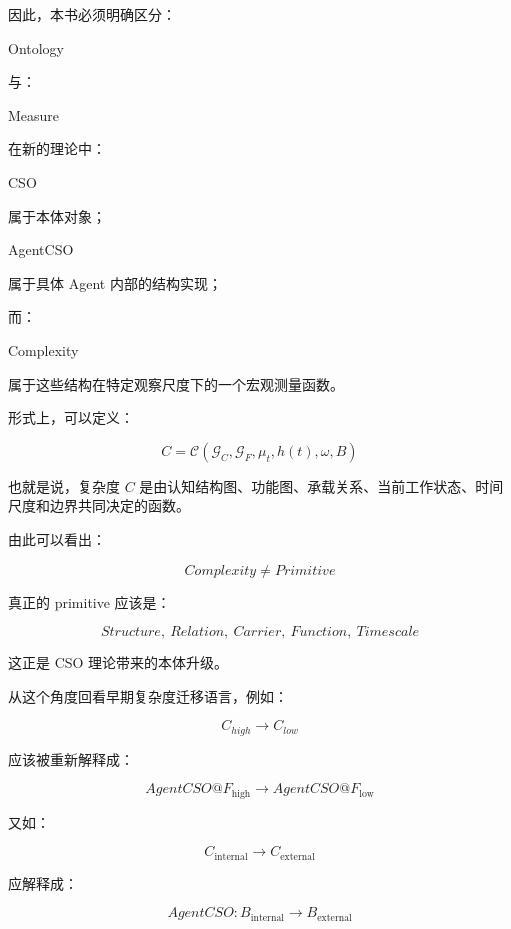 因此，本书必须明确区分：

\begin{statementbox}
Ontology
\end{statementbox}

与：

\begin{statementbox}
Measure
\end{statementbox}

在新的理论中：

\begin{statementbox}
CSO
\end{statementbox}

属于本体对象；

\begin{statementbox}
AgentCSO
\end{statementbox}

属于具体 Agent 内部的结构实现；

而：

\begin{statementbox}
Complexity
\end{statementbox}

属于这些结构在特定观察尺度下的一个宏观测量函数。

形式上，可以定义：

\[
C
=
\mathcal C(
\mathcal G_C,
\mathcal G_F,
\mu_t,
h(t),
\omega,
B
)
\]

也就是说，复杂度 $C$ 是由认知结构图、功能图、承载关系、当前工作状态、时间尺度和边界共同决定的函数。

由此可以看出：

\[
\boxed{
Complexity
\neq
Primitive
}
\]

真正的 primitive 应该是：

\[
\boxed{
Structure,\ Relation,\ Carrier,\ Function,\ Timescale
}
\]

这正是 CSO 理论带来的本体升级。

从这个角度回看早期复杂度迁移语言，例如：

\[
C_{high}\rightarrow C_{low}
\]

应该被重新解释成：

\[
AgentCSO@F_{\mathrm{high}}
\rightarrow
AgentCSO@F_{\mathrm{low}}
\]

又如：

\[
C_{\mathrm{internal}}
\rightarrow
C_{\mathrm{external}}
\]

应解释成：

\[
AgentCSO:
B_{\mathrm{internal}}
\rightarrow
B_{\mathrm{external}}
\]


